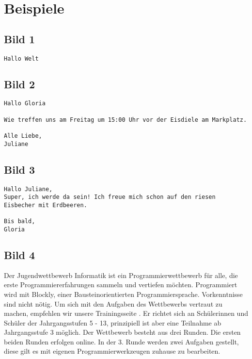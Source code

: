 \section{Beispiele}

\subsection{Bild 1}

\begin{verbatim}
Hallo Welt
\end{verbatim}

\subsection{Bild 2}

\begin{verbatim}
Hallo Gloria

Wie treffen uns am Freitag um 15:00 Uhr vor der Eisdiele am Markplatz.

Alle Liebe,
Juliane
\end{verbatim}

\subsection{Bild 3}

\begin{verbatim}
Hallo Juliane,
Super, ich werde da sein! Ich freue mich schon auf den riesen Eisbecher mit Erdbeeren. 

Bis bald,
Gloria
\end{verbatim}

\subsection{Bild 4}

\begin{flushleft}
Der Jugendwettbewerb Informatik ist ein Programmierwettbewerb für alle, die erste Programmiererfahrungen sammeln und vertiefen möchten. Programmiert wird mit Blockly, einer Bausteinorientierten Programmiersprache. Vorkenntnisse sind nicht nötig. Um sich mit den Aufgaben des Wettbewerbs vertraut zu machen, empfehlen wir unsere Trainingsseite . Er richtet sich an Schülerinnen und Schüler der Jahrgangsstufen 5 - 13, prinzipiell ist aber eine Teilnahme ab Jahrgangsstufe 3 möglich. Der Wettbewerb besteht aus drei Runden. Die ersten beiden Runden erfolgen online. In der 3. Runde werden zwei Aufgaben gestellt, diese gilt es mit eigenen Programmierwerkzeugen zuhause zu bearbeiten.
\end{flushleft}

